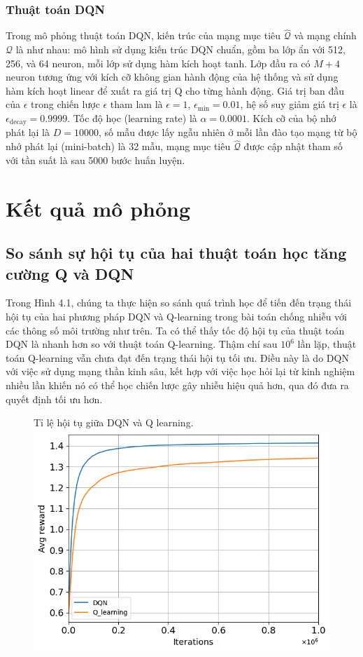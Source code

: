\documentclass{uetgraduation}
\begin{document}
\subsubsection{Thuật toán DQN}
Trong mô phỏng thuật toán DQN, kiến trúc của mạng mục tiêu $\hat{\mathcal{Q}}$ và mạng chính $\mathcal{Q}$ là như nhau: mô hình sử dụng kiến trúc DQN chuẩn, 
gồm ba lớp ẩn với 512, 256, và 64 neuron, mỗi lớp sử dụng hàm kích hoạt tanh. Lớp đầu ra có $M+4$ neuron tương ứng với kích cỡ không gian hành động của hệ thống 
và sử dụng hàm kích hoạt linear để xuất ra giá trị Q cho từng hành động. Giá trị ban đầu của $\epsilon$ trong chiến lược $\epsilon$ tham lam là $\epsilon = 1$,
$\epsilon_\text{min} = 0.01$, hệ số suy giảm giá trị $\epsilon$ là $\epsilon_\text{decay} = 0.9999$. Tốc độ học (learning rate) là $\alpha = 0.0001$. Kích cỡ của bộ
nhớ phát lại là $D = 10000$, số mẫu được lấy ngẫu nhiên ở mỗi lần đào tạo mạng từ bộ nhớ phát lại (mini-batch) là 32 mẫu, mạng mục tiêu $\hat{\mathcal{Q}}$ được cập
nhật tham số với tần suất là sau 5000 bước huấn luyện.

\section{Kết quả mô phỏng}
\subsection{So sánh sự hội tụ của hai thuật toán học tăng cường Q và DQN}
Trong Hình 4.1, chúng ta thực hiện so sánh quá trình học để tiến đến trạng thái hội tụ của hai phương pháp DQN và Q-learning trong bài toán
chống nhiễu với các thông số môi trường như trên. Ta có thể thấy tốc độ hội tụ của thuật toán DQN là nhanh hơn so với thuật toán Q-learning.
Thậm chí sau $10^6$ lần lặp, thuật toán Q-learning vẫn chưa đạt đến trạng thái hội tụ tối ưu. Điều này là do DQN với việc sử dụng mạng thần
kinh sâu, kết hợp với việc học hỏi lại từ kinh nghiệm nhiều lần khiến nó có thể học chiến lược gây nhiễu hiệu quả hơn, qua đó đưa ra quyết định
tối ưu hơn.

\begin{figure}{Tỉ lệ hội tụ giữa DQN và Q learning.}
    \centering
    \includegraphics[scale=0.8]{converged}
    \label{fig:converged}
\end{figure}
\end{document}
